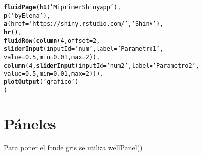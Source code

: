 \documentclass[11pt, oneside]{article}\usepackage[]{graphicx}\usepackage[]{color}
\makeatletter
\newcommand{\hlnum}[1]{\textcolor[rgb]{0.686,0.059,0.569}{#1}}%
\newcommand{\hlstr}[1]{\textcolor[rgb]{0.192,0.494,0.8}{#1}}%
\newcommand{\hlstd}[1]{\textcolor[rgb]{0.345,0.345,0.345}{#1}}%
\newcommand{\hlkwc}[1]{\textcolor[rgb]{0.333,0.667,0.333}{#1}}%
\newcommand{\hlkwd}[1]{\textcolor[rgb]{0.737,0.353,0.396}{\textbf{#1}}}%
\newenvironment{kframe}{%
 \def\at@end@of@kframe{}%
 \ifinner\ifhmode%
  \def\at@end@of@kframe{\end{minipage}}%
  \begin{minipage}{\columnwidth}%
 \fi\fi%
 \def\FrameCommand##1{\hskip\@totalleftmargin \hskip-\fboxsep
 \colorbox{shadecolor}{##1}\hskip-\fboxsep
     \hskip-\linewidth \hskip-\@totalleftmargin \hskip\columnwidth}%
 \MakeFramed {\advance\hsize-\width
   \@totalleftmargin\z@ \linewidth\hsize
   \@setminipage}}%
 {\par\unskip\endMakeFramed%
 \at@end@of@kframe}
\newenvironment{knitrout}{}{} %
\makeatother
\begin{document}
\begin{knitrout}
\color{fgcolor}\begin{kframe}
\begin{alltt}
\hlkwd{fluidPage}\hlstd{(}\hlkwd{h1}\hlstd{(}\hlstr{'Mi primer Shiny app'}\hlstd{),}
          \hlkwd{p}\hlstd{(}\hlstr{'by Elena'}\hlstd{),}
          \hlkwd{a}\hlstd{(}\hlkwc{href}\hlstd{=}\hlstr{'https://shiny.rstudio.com/'}\hlstd{,}\hlstr{'Shiny'}\hlstd{),}
          \hlkwd{hr}\hlstd{(),}
          \hlkwd{fluidRow}\hlstd{(}\hlkwd{column}\hlstd{(}\hlnum{4}\hlstd{,}\hlkwc{offset}\hlstd{=}\hlnum{2}\hlstd{,}
                          \hlkwd{sliderInput}\hlstd{(}\hlkwc{inputId}\hlstd{=} \hlstr{'num'}\hlstd{,}\hlkwc{label}\hlstd{=}\hlstr{'Parametro 1'}\hlstd{,}
                                      \hlkwc{value}\hlstd{=}\hlnum{0.5}\hlstd{,} \hlkwc{min}\hlstd{=}\hlnum{0.01}\hlstd{,} \hlkwc{max}\hlstd{=}\hlnum{2}\hlstd{)),}
                   \hlkwd{column}\hlstd{(}\hlnum{4}\hlstd{,}\hlkwd{sliderInput}\hlstd{(}\hlkwc{inputId}\hlstd{=} \hlstr{'num2'}\hlstd{,} \hlkwc{label}\hlstd{=}\hlstr{'Parametro 2'}\hlstd{,}
                                       \hlkwc{value}\hlstd{=}\hlnum{0.5}\hlstd{,} \hlkwc{min}\hlstd{=}\hlnum{0.01}\hlstd{,}  \hlkwc{max}\hlstd{=}\hlnum{2}\hlstd{))),}
          \hlkwd{plotOutput}\hlstd{(}\hlstr{'grafico'}\hlstd{)}
\hlstd{)}
\end{alltt}
\end{kframe}
\end{knitrout}



\section{Páneles}

Para poner el fonde gris se utiliza wellPanel()
\end{document}
